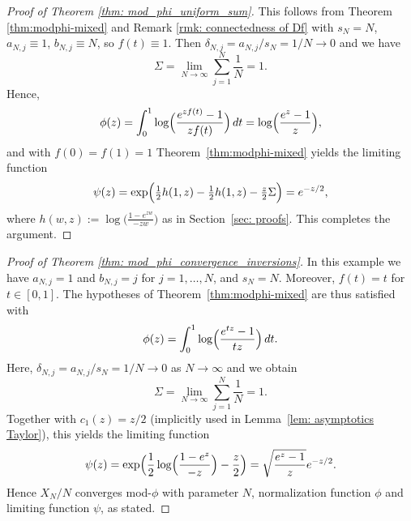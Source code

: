 \documentclass[11pt,a4paper]{scrartcl}
\numberwithin{equation}{section}
\theoremstyle{plain}
\theoremstyle{definition}
\theoremstyle{remark}
\newenvironment{proofof}[1]{\begin{proof}[Proof of #1]}{\end{proof}}
\begin{document}
\begin{proofof}{Theorem {\ref{thm: mod_phi_uniform_sum}}}
This follows from Theorem \ref{thm:modphi-mixed} and Remark \ref{rmk: connectedness of Df} with $s_N=N$, $a_{N,j}\equiv1$, $b_{N,j}\equiv N$, so $f(t)\equiv1$. Then $\delta_{N,j}=a_{N,j}/s_N=1/N\to0$ and we have
\[
\Sigma=\lim_{N\to\infty}\sum_{j=1}^{N}\frac1N=1.
\]
Hence,
\[
\phi(z)=\int_{0}^{1}\log\Bigl(\frac{e^{z f(t)}-1}{z f(t)}\Bigr)\,dt=\log\Bigl(\frac{e^{z}-1}{z}\Bigr),
\]
and with $f(0)=f(1)=1$ Theorem~\ref{thm:modphi-mixed} yields the limiting function
\[
\psi(z)=\exp\Bigl(\tfrac12 h(1,z)-\tfrac12 h(1,z)-\tfrac{z}{2}\Sigma\Bigr)=e^{-z/2},
\]
where $h(w,z):=\log\bigl(\frac{1-e^{zw}}{-zw}\bigr)$ as in Section~\ref{sec: proofs}. This completes the argument.
\end{proofof}

\begin{proofof}{Theorem {\ref{thm: mod_phi_convergence_inversions}}}
In this example we have $a_{N,j}=1$ and $b_{N,j}=j$ for $j=1,\ldots,N$, and $s_N=N$. Moreover, $f(t)=t$ for $t\in[0,1]$. The  hypotheses of Theorem~\ref{thm:modphi-mixed} are thus satisfied with
\[
\phi(z)=\int_{0}^{1} \log\Bigl(\frac{e^{tz}-1}{tz}\Bigr)\,dt.
\]
Here, $\delta_{N,j}=a_{N,j}/s_N=1/N\to0$ as $N\to\infty$ and we obtain
\[
\Sigma=\lim_{N\to\infty}\sum_{j=1}^{N}\frac1N=1.
\]
Together with $c_1(z)=z/2$ (implicitly used in Lemma~\ref{lem: asymptotics Taylor}), this yields the limiting function
\[
\psi(z)=\exp\Bigl(\frac12\log\Bigl(\frac{1-e^{z}}{-z}\Bigr)-\frac{z}{2}\Bigr)=\sqrt{\frac{e^{z}-1}{z}}e^{-z/2}.
\]
Hence $X_N/N$ converges mod-$\phi$ with parameter $N$, normalization function $\phi$ and limiting function $\psi$, as stated.
\end{proofof}
\end{document}
